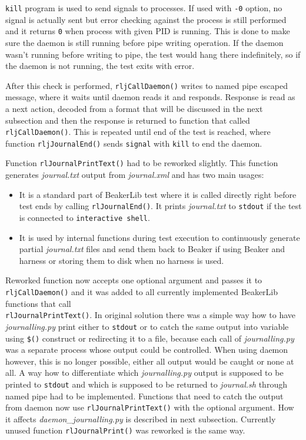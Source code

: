 \texttt{kill} program is used to send signals to processes. If used with \texttt{-0} option, no signal is actually sent but error checking against the process is still performed and it returns \texttt{0} when process with given PID is running\cite{man_kill}. This is done to make sure the daemon is still running before pipe writing operation.  If the daemon wasn't running before writing to pipe, the test would hang there indefinitely, so if the daemon is not running, the test exits with error.

After this check is performed, \texttt{rljCallDaemon()} writes to named pipe escaped message, where it waits until daemon reads it and responds. Response is read as a next action, decoded from a format that will be discussed in the next subsection and then the response is returned to function that called \texttt{rljCallDaemon()}. 
This is repeated until end of the test is reached, where function \texttt{rljJournalEnd()} sends \texttt{signal} with \texttt{kill} to end the daemon.


Function \texttt{rlJournalPrintText()} had to be reworked slightly. This function generates \textit{journal.txt} output from \textit{journal.xml} and has two main usages:
\begin{itemize}
\item It is a standard part of BeakerLib test where it is called directly right before test ends by calling \texttt{rlJournalEnd()}. It prints  \textit{journal.txt} to \texttt{stdout} if the test is connected to \texttt{interactive shell}.
\item It is used by internal functions during test execution to continuously generate partial \textit{journal.txt} files and send them back to Beaker if using Beaker and harness or storing them to disk when no harness is used.
\end{itemize}

Reworked function now accepts one optional argument and passes it to \texttt{rljCallDaemon()} and it was added to all currently implemented BeakerLib functions that call \\ \texttt{rlJournalPrintText()}. In original solution there was a simple way how to have \\ \textit{journalling.py} print either to \texttt{stdout} or to catch the same output into variable using  \texttt{\$()} construct or redirecting it to a file, because each call of  \textit{journalling.py} was a separate process whose output could be controlled. When using daemon however, this is no longer possible, either all output would be caught or none at all.
A way how to differentiate which \textit{journalling.py} output is supposed to be printed to \texttt{stdout} and which is supposed to be returned to \textit{journal.sh} through named pipe had to be implemented. Functions that need to catch the output from daemon now use  \texttt{rlJournalPrintText()} with the optional argument. How it affects \textit{daemon\_journalling.py} is described in next subsection.
Currently unused function \texttt{rlJournalPrint()} was reworked is the same way.

